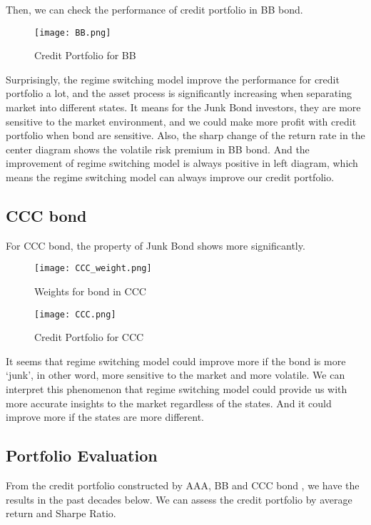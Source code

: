 \documentclass[12pt]{article}
\begin{document}
Then, we can check the performance of credit portfolio in BB bond.

\begin{figure}[H]
\centering
\texttt{[image: BB.png]}\\
\caption{Credit Portfolio for BB}
\end{figure}

Surprisingly, the regime switching model improve the performance for credit portfolio a lot, and the asset process is significantly increasing when separating market into different states. It means for the Junk Bond investors, they are more sensitive to the market environment, and we could make more profit with credit portfolio when bond are sensitive. Also, the sharp change of the return rate in the center diagram shows the volatile risk premium in BB bond. And the improvement of regime switching model is always positive in left diagram, which means the regime switching model can always improve our credit portfolio.

\subsection{CCC bond}
For CCC bond, the property of Junk Bond shows more significantly.
\begin{figure}[H]
\centering
\texttt{[image: CCC\_weight.png]}\\
\caption{Weights for bond in CCC}
\end{figure}
\begin{figure}[H]
\centering
\texttt{[image: CCC.png]}\\
\caption{Credit Portfolio for CCC}
\end{figure}

It seems that regime switching model could improve more if the bond is more `junk', in other word, more sensitive to the market and more volatile. We can interpret this phenomenon that regime switching model could provide us with more accurate insights to the market regardless of the states. And it could improve more if the states are more different.\\

\subsection{Portfolio Evaluation}
From the credit portfolio constructed by AAA, BB and CCC bond , we have the results in the past decades below. We can assess the credit portfolio by average return and Sharpe Ratio.
\end{document}
